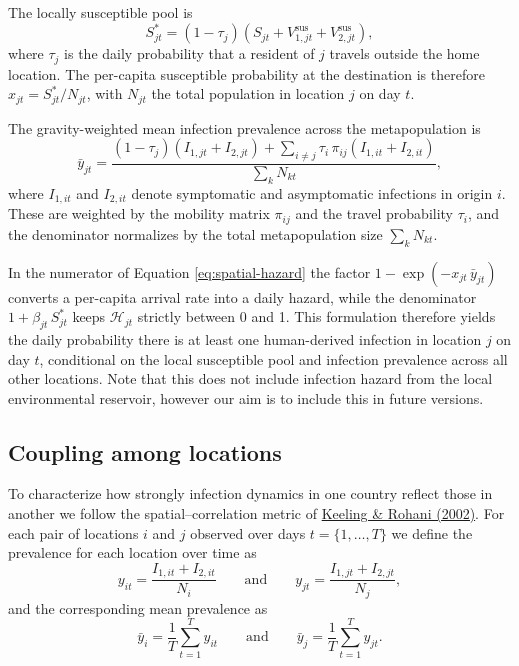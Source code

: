 \documentclass[
]{book}
\begin{document}
The locally susceptible pool is
\begin{equation}
S^{*}_{jt}
  = \left(1-\tau_{j}\right)
    \left(S_{jt}+V^{\mathrm{sus}}_{1,jt}+V^{\mathrm{sus}}_{2,jt}\right),
\label{eq:susceptible-pool}
\end{equation}
where \(\tau_{j}\) is the daily probability that a resident of \(j\) travels outside the home location. The per-capita susceptible probability at the destination is therefore \(x_{jt} = S^{*}_{jt}/N_{jt}\), with \(N_{jt}\) the total population in location \(j\) on day \(t\).

The gravity-weighted mean infection prevalence across the metapopulation is
\begin{equation}
\bar y_{jt} =
\frac{\left(1-\tau_{j}\right)\left(I_{1,jt}+I_{2,jt}\right)
      +\sum_{i\neq j}\tau_{i}\,\pi_{ij}\left(I_{1,it}+I_{2,it}\right)}
     {\displaystyle \sum_{k} N_{kt}},
\label{eq:grav-prevalence}
\end{equation}
where \(I_{1,it}\) and \(I_{2,it}\) denote symptomatic and asymptomatic infections in origin \(i\). These are weighted by the mobility matrix \(\pi_{ij}\) and the travel probability \(\tau_{i}\), and the denominator normalizes by the total metapopulation size \(\sum_{k}N_{kt}\).

In the numerator of Equation \eqref{eq:spatial-hazard} the factor \(1-\exp(-x_{jt}\,\bar y_{jt})\) converts a per-capita arrival rate into a daily hazard, while the denominator \(1+\beta_{jt}\,S^{*}_{jt}\) keeps \(\mathcal{H}_{jt}\) strictly between 0 and 1. This formulation therefore yields the daily probability there is at least one human-derived infection in location \(j\) on day \(t\), conditional on the local susceptible pool and infection prevalence across all other locations. Note that this does not include infection hazard from the local environmental reservoir, however our aim is to include this in future versions.

\subsection{Coupling among locations}\label{coupling-among-locations}

To characterize how strongly infection dynamics in one country reflect those in another we follow the spatial--correlation metric of \href{https://onlinelibrary.wiley.com/doi/abs/10.1046/j.1461-0248.2002.00268.x}{Keeling \& Rohani (2002)}. For each pair of locations \(i\) and \(j\) observed over days \(t = \{1,\dots ,T\}\) we define the prevalence for each location over time as
\begin{equation}
y_{it} = \frac{I_{1,it}+I_{2,it}}{N_i}
\qquad \text{and} \qquad
y_{jt} = \frac{I_{1,jt}+I_{2,jt}}{N_j},
\label{eq:location-prevalence}
\end{equation}
and the corresponding mean prevalence as\\
\begin{equation}
\bar y_i = \frac{1}{T}\sum_{t=1}^{T} y_{it}
\qquad \text{and} \qquad
\bar y_j = \frac{1}{T}\sum_{t=1}^{T} y_{jt}.
\label{eq:location-mean-prevalence}
\end{equation}
\end{document}
